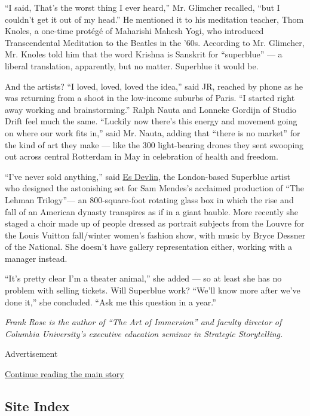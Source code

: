 ``I said, That's the worst thing I ever heard,'' Mr. Glimcher recalled,
``but I couldn't get it out of my head.'' He mentioned it to his
meditation teacher, Thom Knoles, a one-time protégé of Maharishi Mahesh
Yogi, who introduced Transcendental Meditation to the Beatles in the
'60s. According to Mr. Glimcher, Mr. Knoles told him that the word
Krishna is Sanskrit for ``superblue'' --- a liberal translation,
apparently, but no matter. Superblue it would be.

And the artists? ``I loved, loved, loved the idea,'' said JR, reached by
phone as he was returning from a shoot in the low-income suburbs of
Paris. ``I started right away working and brainstorming.'' Ralph Nauta
and Lonneke Gordijn of Studio Drift feel much the same. ``Luckily now
there's this energy and movement going on where our work fits in,'' said
Mr. Nauta, adding that ``there is no market'' for the kind of art they
make --- like the 300 light-bearing drones they sent swooping out across
central Rotterdam in May in celebration of health and freedom.

``I've never sold anything,'' said
\href{https://esdevlin.com/work/louis-vuitton-fw2020}{Es Devlin}, the
London-based Superblue artist who designed the astonishing set for Sam
Mendes's acclaimed production of ``The Lehman Trilogy''--- an
800-square-foot rotating glass box in which the rise and fall of an
American dynasty transpires as if in a giant bauble. More recently she
staged a choir made up of people dressed as portrait subjects from the
Louvre for the Louis Vuitton fall/winter women's fashion show, with
music by Bryce Dessner of the National. She doesn't have gallery
representation either, working with a manager instead.

``It's pretty clear I'm a theater animal,'' she added --- so at least
she has no problem with selling tickets. Will Superblue work? ``We'll
know more after we've done it,'' she concluded. ``Ask me this question
in a year.''

\emph{Frank Rose is the author of ``The Art of Immersion'' and faculty
director of Columbia University's executive education seminar in
Strategic Storytelling.}

Advertisement

\protect\hyperlink{after-bottom}{Continue reading the main story}

\hypertarget{site-index}{%
\subsection{Site Index}\label{site-index}}

